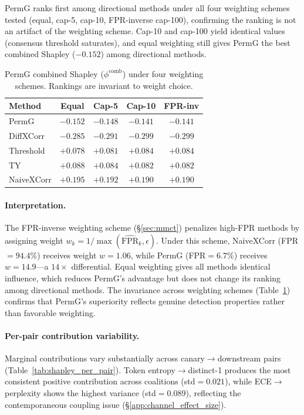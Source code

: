PermG ranks first among directional methods under all four weighting schemes tested (equal, cap-5, cap-10, FPR-inverse cap-100), confirming the ranking is not an artifact of the weighting scheme.
Cap-10 and cap-100 yield identical values (consensus threshold saturates), and equal weighting still gives PermG the best combined Shapley ($-0.152$) among directional methods.

\begin{table}[t]
\centering
\small
\caption{PermG combined Shapley ($\phi^{\text{comb}}$) under four weighting schemes. Rankings are invariant to weight choice.}
\label{tab:weight_robustness}
\begin{tabular}{lcccc}
\toprule
Method & Equal & Cap-5 & Cap-10 & FPR-inv \\
\midrule
PermG & $-0.152$ & $-0.148$ & $-0.141$ & $-0.141$ \\
DiffXCorr & $-0.285$ & $-0.291$ & $-0.299$ & $-0.299$ \\
Threshold & $+0.078$ & $+0.081$ & $+0.084$ & $+0.084$ \\
TY & $+0.088$ & $+0.084$ & $+0.082$ & $+0.082$ \\
NaiveXCorr & $+0.195$ & $+0.192$ & $+0.190$ & $+0.190$ \\
\bottomrule
\end{tabular}
\end{table}

\paragraph{Interpretation.}
The FPR-inverse weighting scheme (\S\ref{sec:mmct}) penalizes high-FPR methods by assigning weight $w_k = 1/\max(\widehat{\mathrm{FPR}}_k, \epsilon)$.
Under this scheme, NaiveXCorr (FPR${=}94.4\%$) receives weight $w{=}1.06$, while PermG (FPR${=}6.7\%$) receives $w{=}14.9$---a $14{\times}$ differential.
Equal weighting gives all methods identical influence, which reduces PermG's advantage but does not change its ranking among directional methods.
The invariance across weighting schemes (Table~\ref{tab:weight_robustness}) confirms that PermG's superiority reflects genuine detection properties rather than favorable weighting.

\paragraph{Per-pair contribution variability.}
Marginal contributions vary substantially across canary$\to$downstream pairs (Table~\ref{tab:shapley_per_pair}).
Token entropy$\to$distinct-1 produces the most consistent positive contribution across coalitions (std${=}0.021$), while ECE$\to$perplexity shows the highest variance (std${=}0.089$), reflecting the contemporaneous coupling issue (\S\ref{app:channel_effect_size}).

